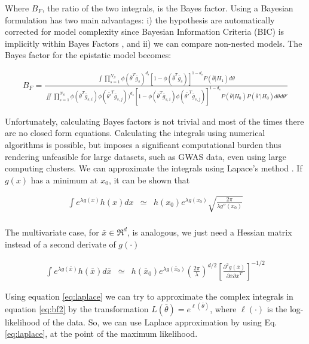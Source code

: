 Where $B_F$, the ratio of the two integrals, is the Bayes factor. Using a Bayesian formulation has two main advantages: i) the hypothesis are automatically corrected for model complexity since Bayesian Information Criteria (BIC) is implicitly within Bayes Factors \cite{kass1993bayes}, and ii) we can compare non-nested models. The Bayes factor for the epistatic model becomes:

\begin{eqnarray}\label{eq:bf2}
	B_F = \frac
	{ \int{ \prod_{s=1}^{N_S}{ \phi( \bar{\theta}^T \bar{g}_s)^{d_s} [ 1-\phi( \bar{\theta}^T \bar{g}_s) ]^{1-d_s} } P( \bar{\theta} | H_1)  d\theta } }
	{ \iint{ \prod_{s=1}^{N_S}{ 
	\phi( \bar{\theta}^T \bar{g}_{s,i}) 
	\phi( \bar{\theta'}^T \bar{g}_{s,j} ) )^{d_s} 
	[ 1-\phi( \bar{\theta}^T \bar{g}_{s,i}) \phi( \bar{\theta'}^T \bar{g}_{s,j} ) ]^{1-d_s} } 
	P( \bar{\theta} | H_0) 
	P( \bar{\theta}' | H_0)  
	d\theta d\theta' } }
\end{eqnarray}

Unfortunately, calculating Bayes factors is not trivial and most of the times there are no closed form equations. Calculating the integrals using numerical algorithms is possible, but  imposes a significant computational burden thus rendering unfeasible for large datasets, such as GWAS data, even using large computing clusters. We can approximate the integrals using Lapace's method  \cite{kass1995bayes}. If $g(x)$ has a minimum at $x_0$, it can be shown that

\begin{eqnarray*}
	\int{e^{\lambda g(x)} h(x) dx} & \simeq & h(x_0) e^{\lambda g(x_0)} \sqrt{\frac{2 \pi}{\lambda g''(x_0)}} \\
\end{eqnarray*}

The multivariate case, for $\bar{x} \in \Re^d$, is analogous, we just need a Hessian matrix instead of a second derivate of $g(\cdot)$

\begin{eqnarray}\label{eq:laplace}
	\int{e^{\lambda g(\bar{x})} h(\bar{x}) d\bar{x}} & \simeq & h(\bar{x}_0) e^{\lambda g(\bar{x}_0)} 
	\left( \frac{2 \pi}{\lambda} \right)^{d/2} \left[ \frac{\partial^2 g(\bar{x}) }{\partial \bar{x} \partial \bar{x}^T} \right] ^{-1/2}
\end{eqnarray}

Using equation \ref{eq:laplace} we can try to approximate the complex integrals in equation \ref{eq:bf2} by the transformation $L(\bar{\theta}) = e^{\ell(\bar{\theta})}$, where $\ell(\cdot)$ is the log-likelihood of the data. So, we can use Laplace approximation by using Eq.\ref{eq:laplace}, at the point of the maximum likelihood.

